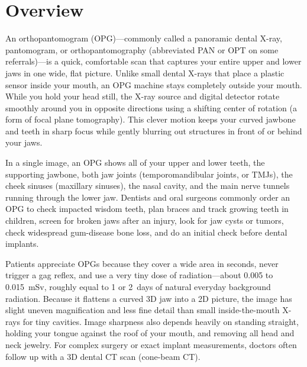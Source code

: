 \label{ch:infographic-opg}

\section{Overview}

An orthopantomogram (OPG)---commonly called a panoramic dental X-ray, pantomogram, or orthopantomography (abbreviated PAN or OPT on some referrals)---is a quick, comfortable scan that captures your entire upper and lower jaws in one wide, flat picture. Unlike small dental X-rays that place a plastic sensor inside your mouth, an OPG machine stays completely outside your mouth. While you hold your head still, the X-ray source and digital detector rotate smoothly around you in opposite directions using a shifting center of rotation (a form of focal plane tomography). This clever motion keeps your curved jawbone and teeth in sharp focus while gently blurring out structures in front of or behind your jaws.

In a single image, an OPG shows all of your upper and lower teeth, the supporting jawbone, both jaw joints (temporomandibular joints, or TMJs), the cheek sinuses (maxillary sinuses), the nasal cavity, and the main nerve tunnels running through the lower jaw. Dentists and oral surgeons commonly order an OPG to check impacted wisdom teeth, plan braces and track growing teeth in children, screen for broken jaws after an injury, look for jaw cysts or tumors, check widespread gum-disease bone loss, and do an initial check before dental implants.

Patients appreciate OPGs because they cover a wide area in seconds, never trigger a gag reflex, and use a very tiny dose of radiation---about 0.005 to 0.015~mSv, roughly equal to 1 or 2~days of natural everyday background radiation. Because it flattens a curved 3D jaw into a 2D picture, the image has slight uneven magnification and less fine detail than small inside-the-mouth X-rays for tiny cavities. Image sharpness also depends heavily on standing straight, holding your tongue against the roof of your mouth, and removing all head and neck jewelry. For complex surgery or exact implant measurements, doctors often follow up with a 3D dental CT scan (cone-beam CT).

